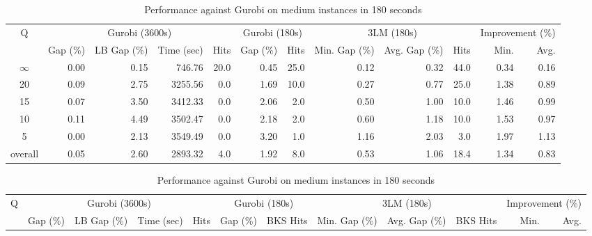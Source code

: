 \begin{table}[H]
\centering
\caption{Performance against Gurobi on medium instances in 180 seconds}
\label{tab:3lm_resuts150T180}
\begin{tabular}{c rrrr rr rrr rr}
\toprule
       Q & \multicolumn{4}{c}{Gurobi (3600s)} & \multicolumn{2}{c}{Gurobi (180s)} & \multicolumn{3}{c}{3LM (180s)} & \multicolumn{2}{c}{Improvement (\%)} \\
         &       Gap (\%) & LB Gap (\%) & Time (sec) & Hits &      Gap (\%) & Hits & Min. Gap (\%) & Avg. Gap (\%) & Hits &             Min. & Avg. \\
\cmidrule(lr){1-1} \cmidrule(lr){2-5} \cmidrule(lr){2-5} \cmidrule(lr){6-7} \cmidrule(lr){8-10} \cmidrule(lr){11-12}
$\infty$ &           0.00 &        0.15 &     746.76 & 20.0 &          0.45 & 25.0 &          0.12 &          0.32 & 44.0 &             0.34 & 0.16 \\
      20 &           0.09 &        2.75 &    3255.56 &  0.0 &          1.69 & 10.0 &          0.27 &          0.77 & 25.0 &             1.38 & 0.89 \\
      15 &           0.07 &        3.50 &    3412.33 &  0.0 &          2.06 &  2.0 &          0.50 &          1.00 & 10.0 &             1.46 & 0.99 \\
      10 &           0.11 &        4.49 &    3502.47 &  0.0 &          2.18 &  2.0 &          0.60 &          1.18 & 10.0 &             1.53 & 0.97 \\
       5 &           0.00 &        2.13 &    3549.49 &  0.0 &          3.20 &  1.0 &          1.16 &          2.03 &  3.0 &             1.97 & 1.13 \\
\midrule
 overall &           0.05 &        2.60 &    2893.32 &  4.0 &          1.92 &  8.0 &          0.53 &          1.06 & 18.4 &             1.34 & 0.83 \\
\bottomrule
\end{tabular}
\end{table}\begin{table}[H]
\centering
\caption{Performance against Gurobi on medium instances in 180 seconds}
\label{tab:3lm_resuts150T180}
\begin{tabular}{c rrrr rr rrr rr}
\toprule
       Q & \multicolumn{4}{c}{Gurobi (3600s)} & \multicolumn{2}{c}{Gurobi (180s)} & \multicolumn{3}{c}{3LM (180s)} & \multicolumn{2}{c}{Improvement (\%)} \\
         &       Gap (\%) & LB Gap (\%) & Time (sec) & Hits &      Gap (\%) & BKS Hits & Min. Gap (\%) & Avg. Gap (\%) & BKS Hits &             Min. & Avg. \\

\end{tabular}
\end{table}
